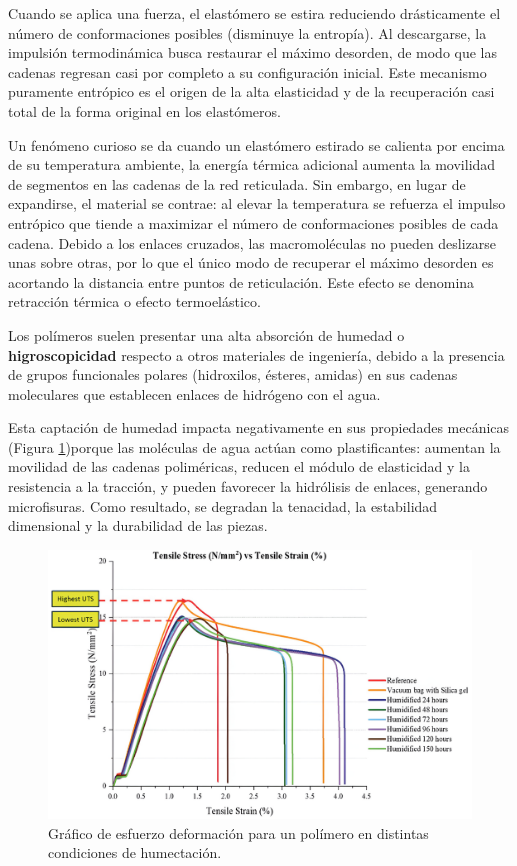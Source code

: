 Cuando se aplica una fuerza, el elastómero se estira reduciendo drásticamente el número de conformaciones posibles (disminuye la entropía). Al descargarse, la impulsión termodinámica busca restaurar el máximo desorden, de modo que las cadenas regresan casi por completo a su configuración inicial. Este mecanismo puramente entrópico es el origen de la alta elasticidad y de la recuperación casi total de la forma original en los elastómeros. 

Un fenómeno curioso se da cuando un elastómero estirado se calienta por encima de su temperatura ambiente, la energía térmica adicional aumenta la movilidad de segmentos en las cadenas de la red reticulada. Sin embargo, en lugar de expandirse, el material se contrae: al elevar la temperatura se refuerza el impulso entrópico que tiende a maximizar el número de conformaciones posibles de cada cadena. Debido a los enlaces cruzados, las macromoléculas no pueden deslizarse unas sobre otras, por lo que el único modo de recuperar el máximo desorden es acortando la distancia entre puntos de reticulación. Este efecto se denomina retracción térmica o efecto termoelástico.

Los polímeros suelen presentar una alta absorción de humedad o \textbf{higroscopicidad} respecto a otros materiales de ingeniería, debido a la presencia de grupos funcionales polares (hidroxilos, ésteres, amidas) en sus cadenas moleculares que establecen enlaces de hidrógeno con el agua.  



Esta captación de humedad impacta negativamente en sus propiedades mecánicas (Figura \ref{humid})porque las moléculas de agua actúan como plastificantes: aumentan la movilidad de las cadenas poliméricas, reducen el módulo de elasticidad y la resistencia a la tracción, y pueden favorecer la hidrólisis de enlaces, generando microfisuras. Como resultado, se degradan la tenacidad, la estabilidad dimensional y la durabilidad de las piezas.

\begin{figure}[h!]
    \centering
    \includegraphics[width=1.0\linewidth]{imgs/humd.png}
    \caption{Gráfico de esfuerzo deformación para un polímero en distintas condiciones de humectación.}
    \label{humid}
\end{figure}
